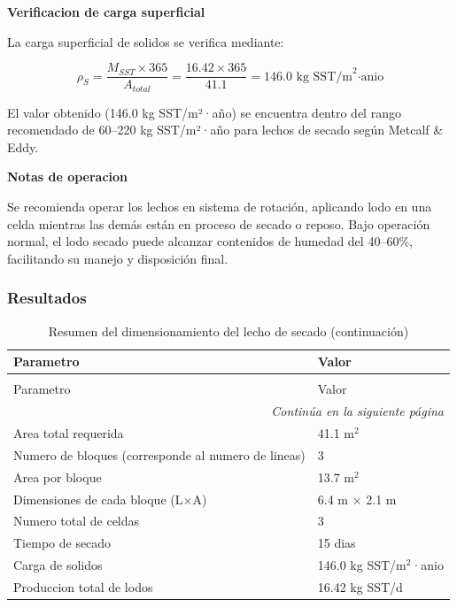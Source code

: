 \documentclass[12pt,a4paper]{article}
\begin{document}
\textbf{Verificacion de carga superficial}

La carga superficial de solidos se verifica mediante:

\begin{equation}
\rho_S = \frac{M_{SST} \times 365}{A_{total}} = \frac{16.42 \times 365}{41.1} = 146.0 \text{ kg SST/m}^2\text{·anio}
\end{equation}

El valor obtenido (146.0 kg SST/m²·año) se encuentra dentro del rango recomendado de 60--220 kg SST/m²·año para lechos de secado según Metcalf & Eddy.

\textbf{Notas de operacion}

Se recomienda operar los lechos en sistema de rotación, aplicando lodo en una celda mientras las demás están en proceso de secado o reposo. Bajo operación normal, el lodo secado puede alcanzar contenidos de humedad del 40--60\%, facilitando su manejo y disposición final.

\subsubsection{Resultados}

\begingroup
\small
\begin{longtable}{ll}
\caption{Resumen del dimensionamiento del lecho de secado}\\
\toprule
Parametro & Valor \\
\midrule
\endfirsthead
\caption[]{Resumen del dimensionamiento del lecho de secado (continuación)}\\
\toprule
Parametro & Valor \\
\midrule
\endhead
\midrule
\multicolumn{2}{r}{\textit{Continúa en la siguiente página}} \\
\endfoot
\bottomrule
\endlastfoot
Area total requerida & 41.1 m$^2$ \\
Numero de bloques (corresponde al numero de lineas) & 3 \\
Area por bloque & 13.7 m$^2$ \\
Dimensiones de cada bloque (L$\times$A) & 6.4 m $\times$ 2.1 m \\
Numero total de celdas & 3 \\
Tiempo de secado & 15 dias \\
Carga de solidos & 146.0 kg SST/m$^2$·anio \\
Produccion total de lodos & 16.42 kg SST/d \\
\end{longtable}
\endgroup
\end{document}
